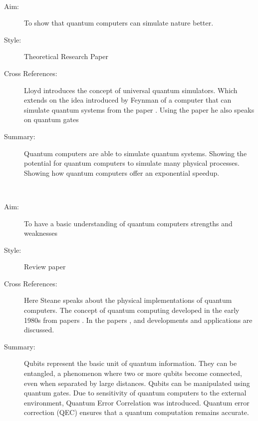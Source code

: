 \documentclass{Assignment}
\begin{document}
\newpage
\cite{UQS}~

\begin{description}
	\item[Aim:] 
	To show that quantum computers can simulate nature better.
	
	\item [Style:] Theoretical Research Paper
	
	\item [Cross References:]
	Lloyd introduces the concept of universal quantum simulators. 
	Which extends on the idea introduced by Feynman of a computer that can simulate quantum systems from the paper \cite{feynman1982simulating}. 
	Using the paper \cite{Deutsch1989} he also speaks on quantum gates
	
	\item[Summary:] 
	Quantum computers are able to simulate quantum systems. 
	Showing the potential for quantum computers to simulate many physical processes.	
	Showing how quantum computers offer an exponential speedup.

	
	
\end{description}
\newpage
\cite{AndrewSteane}~
\begin{description}
	\item[Aim:] 
	To have a basic understanding of quantum computers strengths and weaknesses
	
	\item [Style:] 
	Review paper
	
	\item [Cross References:] 
	Here Steane speaks about the physical implementations of quantum computers. 
	The concept of quantum computing developed in the early 1980s from papers \cite{feynman1982simulating}. 	
	In the papers \cite{PhysRevA.93.032301}, \cite{doi:10.1137/S0097539796298637} and \cite{UQS} developments and applications are discussed.
	
	\item[Summary:] 
	Qubits represent the basic unit of quantum information.
	They can be entangled, a phenomenon where two or more qubits become connected, even when separated by large distances.
	Qubits can be manipulated using quantum gates.
	Due to sensitivity of quantum computers to the external environment, Quantum Error Correlation was introduced.
	Quantum error correction (QEC) ensures that a quantum computation remains  accurate.
\end{description}
	 	\newpage
	 	
\end{document}
